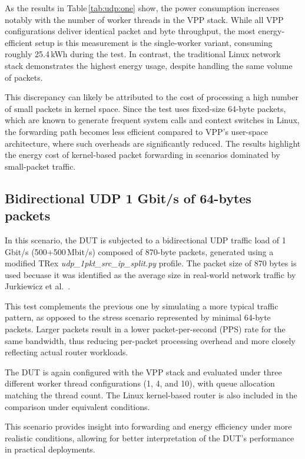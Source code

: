 As the results in Table \ref{tab:udp:one} show, the power consumption increases notably with the number of worker threads in the VPP stack. 
While all VPP configurations deliver identical packet and byte throughput, the most energy-efficient setup is this measurement is the single-worker variant, consuming roughly 25.4 kWh during the test. 
In contrast, the traditional Linux network stack demonstrates the highest energy usage, despite handling the same volume of packets.

This discrepancy can likely be attributed to the cost of processing a high number of small packets in kernel space. 
Since the test uses fixed-size 64-byte packets, which are known to generate frequent system calls and context switches in Linux, 
the forwarding path becomes less efficient compared to VPP’s user-space architecture, where such overheads are significantly reduced. 
The results highlight the energy cost of kernel-based packet forwarding in scenarios dominated by small-packet traffic.

\subsection{Bidirectional UDP 1 Gbit/s of 64-bytes packets}

In this scenario, the DUT is subjected to a bidirectional UDP traffic load of 1\,Gbit/s (500+500\,Mbit/s) composed of 870-byte packets, 
generated using a modified TRex \textit{udp\_1pkt\_src\_ip\_split.py} profile. 
The packet size of 870 bytes is used becuase it was identified as the average size in real-world network traffic by Jurkiewicz et al.~\cite{JURKIEWICZ202115}.

This test complements the previous one by simulating a more typical traffic pattern, as opposed to the stress scenario represented by minimal 64-byte packets. 
Larger packets result in a lower packet-per-second (PPS) rate for the same bandwidth, thus reducing per-packet processing overhead and more closely reflecting actual router workloads.

The DUT is again configured with the VPP stack and evaluated under three different worker thread configurations (1, 4, and 10), with queue allocation matching the thread count. 
The Linux kernel-based router is also included in the comparison under equivalent conditions.

This scenario provides insight into forwarding and energy efficiency under more realistic conditions, allowing for better interpretation of the DUT’s performance in practical deployments.


